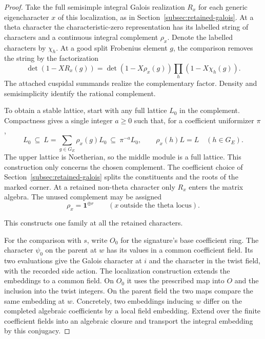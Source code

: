 \begin{proof}
Take the full semisimple integral Galois realization \(R_x\)
for each generic eigencharacter \(x\) of this localization,
as in Section~\ref{subsec:retained-galois}. At a theta
character the characteristic-zero representation has its
labelled string of characters and a continuous integral
complement \(\rho_x\). Denote the labelled characters by \(\chi_h\). At a good split Frobenius element \(g\), the comparison removes the string by the factorization
\[
 \det(1-XR_x(g))=\det(1-X\rho_x(g))\prod_h(1-X\chi_h(g)).
\]
The attached cuspidal summands realize the complementary factor. Density and semisimplicity identify the rational complement.

To obtain a stable lattice, start with any full lattice
\(L_0\) in the complement. Compactness gives a single integer
\(a\ge 0\) such that, for a coefficient uniformizer \(\pi\),
\[
 L_0\ \subseteq\ L=\sum_{g\in G_E}\rho_x(g)L_0
       \ \subseteq\ \pi^{-a}L_0,\qquad
 \rho_x(h)L=L\quad(h\in G_E).
\]
The upper lattice is Noetherian, so the middle module is a
full lattice. This construction only concerns the chosen complement.
The coefficient choice of Section~\ref{subsec:retained-galois}
splits the constituents and the roots of the marked corner.
At a retained non-theta character only \(R_x\) enters the matrix algebra. The unused complement may be assigned
\[
 \rho_x=\mathbf1^{\oplus r}\qquad(x\ \text{outside the theta locus}).
\]

This constructs one family at all the retained characters.
\label{cor:marked-localization-2}

For the comparison with \(s\), write \(O_0\) for the signature's
base coefficient ring. The character \(\psi_0\) on the parent
at \(w\) has its values in a common coefficient field. Its
two evaluations give the Galois character at \(i\) and the
character in the twist field, with the recorded side action.
The localization construction extends the embeddings to a
common field. On \(O_0\) it uses the prescribed map into
\(O\) and the inclusion into the twist integers. On the
parent field the two maps compare the same embedding at \(w\).
Concretely, two embeddings inducing \(w\) differ on the
completed algebraic coefficients by a local field embedding.
Extend over the finite coefficient fields into an algebraic
closure and transport the integral embedding by this
conjugacy.


\end{proof}
